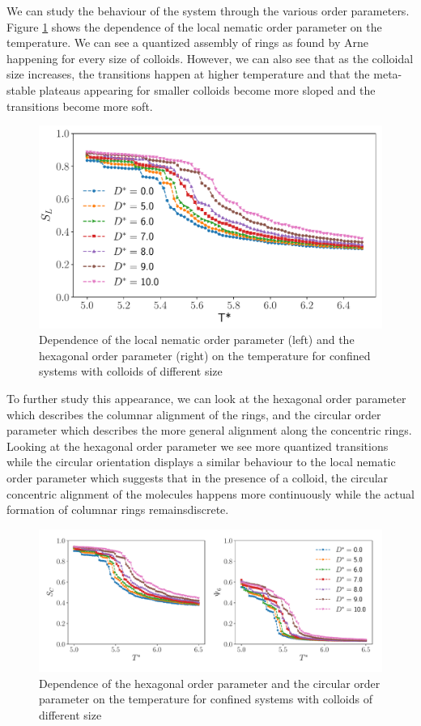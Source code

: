 We can study the behaviour of the system through the various order parameters. 
Figure \ref{fig:ceoC8nemloc} shows the dependence of the local nematic order parameter on the temperature. We can see a quantized assembly of rings as found by Arne happening for every size of colloids. However, we can also see that as the colloidal size increases, the transitions happen at higher temperature and that the meta-stable plateaus appearing for smaller colloids become more sloped and the transitions become more soft. 


\begin{figure}[H]
    \centering
	\includegraphics[width=0.8\linewidth]{plots/ceo_W8C8_nemloc.pdf}
	\caption{Dependence of the local nematic order parameter (left) and the hexagonal order parameter (right) on the temperature for confined systems with colloids of different size}
    \label{fig:ceoC8nemloc}
\end{figure}
To further study this appearance, we can look at the hexagonal order parameter which describes the columnar alignment of the rings, and the circular order parameter which describes the more general alignment along the concentric rings. 
Looking at the hexagonal order parameter we see more quantized transitions while the circular orientation
displays a similar behaviour to the local nematic order parameter which suggests that in the presence of a colloid, the circular concentric alignment of the molecules happens more continuously while the actual formation of columnar rings remainsdiscrete.  

\begin{figure}[H]
    \centering
	\includegraphics[width=\linewidth]{plots/ceo_W8C8_circhex.pdf}
	\caption{Dependence of the hexagonal order parameter and the circular order parameter on the temperature for confined systems with colloids of different size}
    \label{fig:ceoC8hex}
\end{figure}

